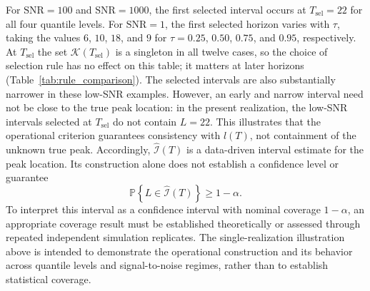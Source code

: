 \documentclass[12pt,a4paper]{article}
\begin{document}
For $\mathrm{SNR}=100$ and $\mathrm{SNR}=1000$, the first selected
interval occurs at $T_{\mathrm{sel}}=22$ for all four quantile levels.
For $\mathrm{SNR}=1$, the first selected horizon varies with $\tau$,
taking the values $6$, $10$, $18$, and $9$ for
$\tau=0.25$, $0.50$, $0.75$, and $0.95$, respectively. At
$T_{\mathrm{sel}}$ the set $\mathcal K(T_{\mathrm{sel}})$ is a singleton
in all twelve cases, so the choice of selection rule has no effect on
this table; it matters at later horizons
(Table~\ref{tab:rule_comparison}). The selected
intervals are also substantially narrower in these low-SNR examples.
However, an early and narrow interval need not be close to the true
peak location: in the present realization, the low-SNR intervals
selected at $T_{\mathrm{sel}}$ do not contain $L=22$. This illustrates
that the operational criterion guarantees consistency with
$\widehat l(T)$, not containment of the unknown true peak.
Accordingly, $\widehat{\mathcal I}(T)$ is a data-driven interval
estimate for the peak location. Its construction alone does not
establish a confidence level or guarantee
\[
\mathbb P\!\left\{
L\in\widehat{\mathcal I}(T)
\right\}
\geq 1-\alpha.
\]
To interpret this interval as a confidence interval with nominal
coverage $1-\alpha$, an appropriate coverage result must be established
theoretically or assessed through repeated independent simulation
replicates. The single-realization illustration above is intended to
demonstrate the operational construction and its behavior across
quantile levels and signal-to-noise regimes, rather than to establish
statistical coverage.
\end{document}
